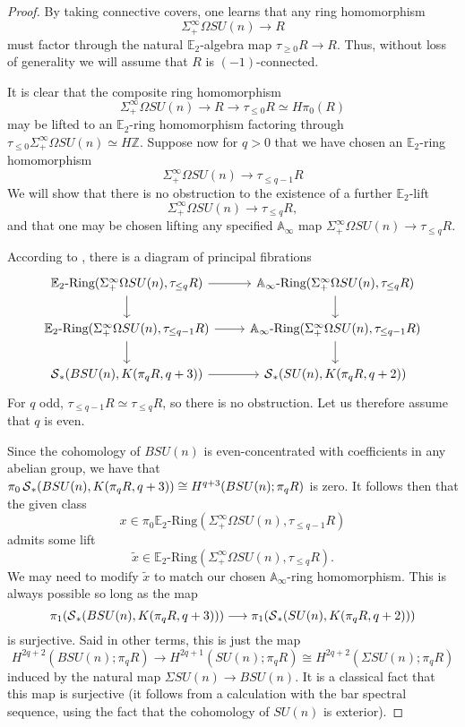 \begin{proof} 
By taking connective covers, one learns that any ring homomorphism
$$\Sigma^{\infty}_+ \Omega SU(n) \rightarrow R$$
must factor through the natural $\mathbb{E}_2$-algebra map $\tau_{\ge 0} R \rightarrow R$.  Thus, without loss of generality we will assume that $R$ is $(-1)$-connected.

It is clear that the composite ring homomorphism
$$\Sigma^{\infty}_+ \Omega SU(n) \longrightarrow R \longrightarrow \tau_{\le 0} R \simeq H\pi_0(R)$$
may be lifted to an $\mathbb{E}_2$-ring homomorphism factoring through $\tau_{\le 0} \Sigma^{\infty}_+ \Omega SU(n) \simeq H\mathbb{Z}$.   Suppose now for $q>0$ that we have chosen an $\mathbb{E}_2$-ring homomorphism 
$$\Sigma^{\infty}_+ \Omega SU(n) \longrightarrow \tau_{\le q-1} R$$
We will show that there is no obstruction to the existence of a further $\mathbb{E}_2$-lift $$\Sigma^{\infty}_+ \Omega SU(n) \longrightarrow \tau_{\le q} R,$$
and that one may be chosen lifting any specified $\mathbb{A}_\infty$ map $\Sigma^{\infty}_+ \Omega SU(n) \rightarrow \tau_{\le q} R$.

According to \cite[Theorem $4.1$]{ChadwickMandell}, there is a diagram of principal fibrations
$$
\begin{tikzcd}
\mathbb{E}_2\text{-Ring}(\Sigma^{\infty}_+ \Omega SU(n), \tau_{\le q} R) \arrow{r} \arrow{d} & \mathbb{A}_\infty\text{-Ring}(\Sigma^{\infty}_+ \Omega SU(n), \tau_{\le q} R) \arrow{d} \\
\mathbb{E}_2\text{-Ring}(\Sigma^{\infty}_+ \Omega SU(n), \tau_{\le q-1} R) \arrow{r} \arrow{d} & \mathbb{A}_\infty\text{-Ring}(\Sigma^{\infty}_+ \Omega SU(n), \tau_{\le q-1} R) \arrow{d} \\
\cS_*(BSU(n),K(\pi_q R,q+3)) \arrow{r} & \cS_*(SU(n),K(\pi_q R,q+2))
\end{tikzcd}
$$
For $q$ odd, $\tau_{\le q-1} R \simeq \tau_{\le q} R$, so there is no obstruction.  Let us therefore assume that $q$ is even.

Since the cohomology of $BSU(n)$ is even-concentrated with coefficients in any abelian group, we have that $\pi_0 \operatorname{\mathcal{S}}_*(BSU(n),K(\pi_q R,q+3)) \cong H^{q+3}(BSU(n);\pi_q R)$ is zero.  It follows then that the given class $$x \in \pi_0 \mathbb{E}_2\text{-Ring}(\Sigma^{\infty}_+ \Omega SU(n), \tau_{\le q-1} R)$$ admits some lift $$\widetilde{x} \in \mathbb{E}_2\text{-Ring}(\Sigma^{\infty}_+ \Omega SU(n), \tau_{\le q} R).$$  We may need to modify $\widetilde{x}$ to match our chosen $\mathbb{A}_\infty$-ring homomorphism.  This is always possible so long as the map
$$\pi_1(\operatorname{\mathcal{S}}_*(BSU(n),K(\pi_q R,q+3))) \longrightarrow \pi_1(\operatorname{\mathcal{S}}_*(SU(n),K(\pi_q R,q+2)))$$
is surjective.  Said in other terms, this is just the map
$$H^{2q+2}(BSU(n);\pi_q R) \longrightarrow H^{2q+1}(SU(n);\pi_q R) \cong H^{2q+2}(\Sigma SU(n);\pi_q R)$$
induced by the natural map $\Sigma SU(n) \rightarrow BSU(n)$.  It is a classical fact that this map is surjective (it follows from a calculation with the bar spectral sequence, using the fact that the cohomology of $SU(n)$ is exterior).
\end{proof}